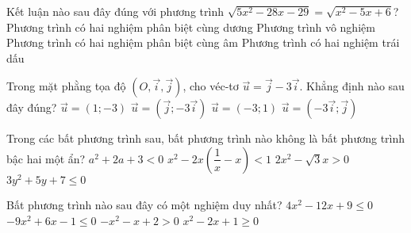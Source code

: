 \begin{ex}%
	Kết luận nào sau đây đúng với phương trình $\sqrt{5x^2-28x-29}=\sqrt{x^2-5x+6}$?
	\choice
	{Phương trình có hai nghiệm phân biệt cùng dương}
	{Phương trình vô nghiệm}
	{Phương trình có hai nghiệm phân biệt cùng âm}
	{\True Phương trình có hai nghiệm trái dấu}
\end{ex}

\begin{ex}%
	Trong mặt phằng tọa độ $(O, \vec{i}, \vec{j})$, cho véc-tơ $\vec{u}=\vec{j}-3\vec{i}$. Khẳng định nào sau đây đúng?
	\choice
	{$\vec{u}=(1;-3)$}
	{$\vec{u}=(\vec{j}; -3\vec{i})$}
	{\True $\vec{u}=(-3; 1)$}
	{$\vec{u}=(-3\vec{i}; \vec{j})$}
\end{ex}

\begin{ex}%
	Trong các bất phương trình sau, bất phương trình nào không là bất phương trình bậc hai một ẩn?
	\choice
	{$a^2+2a+3<0$}
	{$x^2-2x\left(\dfrac{1}{x}-x\right)<1$}
	{\True $2x^2-\sqrt{3}x>0$}
	{$3y^2+5y+7\leq 0$}
\end{ex}

\begin{ex}%
	Bất phương trình nào sau đây có một nghiệm duy nhất?
	\choice
	{\True $4x^2-12x+9\leq 0$}
	{$-9x^2+6x-1\leq 0$}
	{$-x^2-x+2>0$}
	{$x^2-2x+1\geq 0$}
\end{ex}

